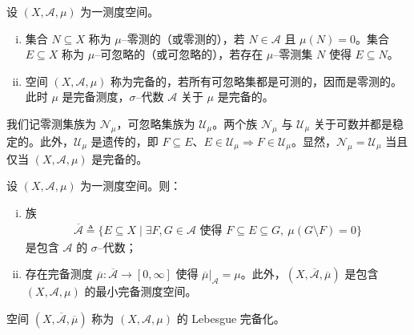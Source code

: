 \documentclass[../../main.tex]{subfiles}%
\begin{document}
\begin{definition}\label{definition:ch01-零测集}
设 $(X,\mathcal{A},\mu)$ 为一测度空间。
\begin{enumerate}[(i)]
\item 集合 $N\subseteq X$ 称为 $\mu$--零测的（或零测的），若 $N\in\mathcal{A}$ 且 $\mu(N)=0$。集合 $E\subseteq X$ 称为 $\mu$--可忽略的（或可忽略的），若存在 $\mu$--零测集 $N$ 使得 $E\subseteq N$。
\item 空间 $(X,\mathcal{A},\mu)$ 称为完备的，若所有可忽略集都是可测的，因而是零测的。此时 $\mu$ 是完备测度，$\sigma$--代数 $\mathcal{A}$ 关于 $\mu$ 是完备的。
\end{enumerate}
\end{definition}

我们记零测集族为 $\mathcal{N}_\mu$，可忽略集族为 $\mathcal{U}_\mu$。两个族 $\mathcal{N}_\mu$ 与 $\mathcal{U}_\mu$ 关于可数并都是稳定的。此外，$\mathcal{U}_\mu$ 是遗传的，即 $F\subseteq E$、$E\in\mathcal{U}_\mu\Rightarrow F\in\mathcal{U}_\mu$。显然，$\mathcal{N}_\mu=\mathcal{U}_\mu$ 当且仅当 $(X,\mathcal{A},\mu)$ 是完备的。

\begin{theorem}\label{theorem:ch01-Lebesgue完备化}\label{definition:ch01-完备化}
设 $(X,\mathcal{A},\mu)$ 为一测度空间。则：
\begin{enumerate}[(i)]
\item 族
\begin{align}
\overline{\mathcal{A}}\triangleq \{E\subseteq X\mid\exists F,G\in\mathcal{A}\text{ 使得 }F\subseteq E\subseteq G,\ \mu(G\setminus F)=0\} \label{align:ch01-完备sigma代数}
\end{align}
是包含 $\mathcal{A}$ 的 $\sigma$--代数；
\item 存在完备测度 $\overline{\mu}:\overline{\mathcal{A}}\to[0,\infty]$ 使得 $\overline{\mu}|_{\mathcal{A}}=\mu$。此外，$(X,\overline{\mathcal{A}},\overline{\mu})$ 是包含 $(X,\mathcal{A},\mu)$ 的最小完备测度空间。
\end{enumerate}
\end{theorem}

\begin{definition}\label{definition:ch01-Lebesgue完备化}
空间 $(X,\overline{\mathcal{A}},\overline{\mu})$ 称为 $(X,\mathcal{A},\mu)$ 的 Lebesgue 完备化。
\end{definition}
\end{document}
